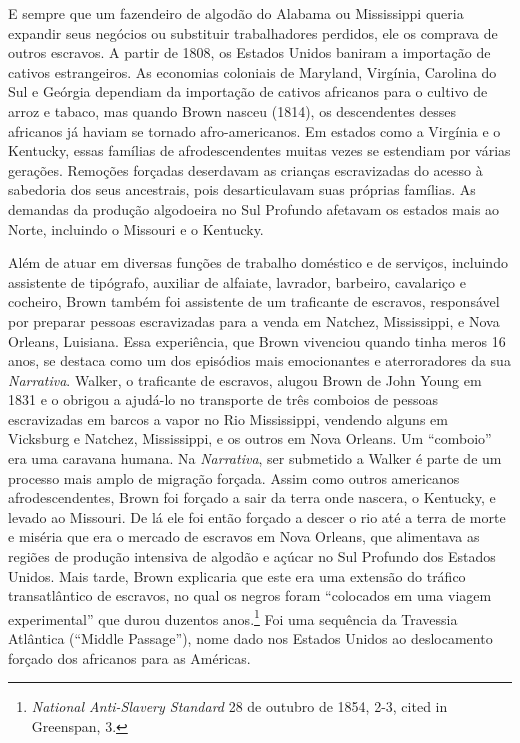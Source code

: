E sempre que um fazendeiro de algodão do Alabama ou Mississippi queria
expandir seus negócios ou substituir trabalhadores perdidos, ele os
comprava de outros escravos. A partir de 1808, os Estados Unidos baniram
a importação de cativos estrangeiros. As economias coloniais de
Maryland, Virgínia, Carolina do Sul e Geórgia dependiam da importação de
cativos africanos para o cultivo de arroz e tabaco, mas quando Brown
nasceu (1814), os descendentes desses africanos já haviam se tornado
afro-americanos. Em estados como a Virgínia e o Kentucky, essas famílias
de afrodescendentes muitas vezes se estendiam por várias gerações.
Remoções forçadas deserdavam as crianças escravizadas do acesso à
sabedoria dos seus ancestrais, pois desarticulavam suas próprias
famílias. As demandas da produção algodoeira no Sul Profundo afetavam os
estados mais ao Norte, incluindo o Missouri e o Kentucky.

Além de atuar em diversas funções de trabalho doméstico e de serviços,
incluindo assistente de tipógrafo, auxiliar de alfaiate, lavrador,
barbeiro, cavalariço e cocheiro, Brown também foi assistente de um
traficante de escravos, responsável por preparar pessoas escravizadas
para a venda em Natchez, Mississippi, e Nova Orleans, Luisiana. Essa
experiência, que Brown vivenciou quando tinha meros 16 anos, se destaca
como um dos episódios mais emocionantes e aterroradores da sua
\emph{Narrativa}. Walker, o traficante de escravos, alugou Brown de John
Young em 1831 e o obrigou a ajudá-lo no transporte de três comboios de
pessoas escravizadas em barcos a vapor no Rio Mississippi, vendendo
alguns em Vicksburg e Natchez, Mississippi, e os outros em Nova Orleans.
Um ``comboio'' era uma caravana humana. Na \emph{Narrativa}, ser
submetido a Walker é parte de um processo mais amplo de migração
forçada. Assim como outros americanos afrodescendentes, Brown foi
forçado a sair da terra onde nascera, o Kentucky, e levado ao Missouri.
De lá ele foi então forçado a descer o rio até a terra de morte e
miséria que era o mercado de escravos em Nova Orleans, que alimentava as
regiões de produção intensiva de algodão e açúcar no Sul Profundo dos
Estados Unidos. Mais tarde, Brown explicaria que este era uma extensão
do tráfico transatlântico de escravos, no qual os negros foram
``colocados em uma viagem experimental'' que durou duzentos
anos.\footnote{\emph{National Anti-Slavery Standard} 28 de outubro de
  1854, 2-3, cited in Greenspan, 3.} Foi uma sequência da Travessia
Atlântica (``Middle Passage''), nome dado nos Estados Unidos ao
deslocamento forçado dos africanos para as Américas.

